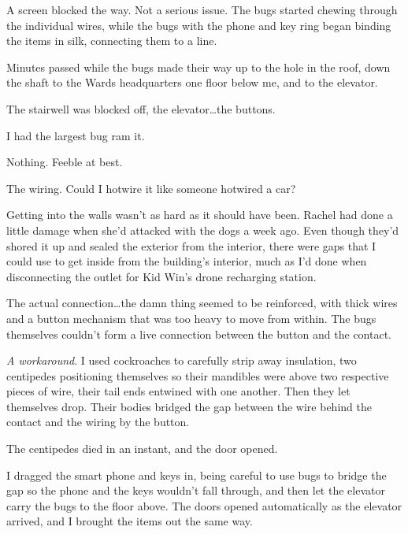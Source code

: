 A screen blocked the way.  Not a serious issue.  The bugs started chewing through the individual wires, while the bugs with the phone and key ring began binding the items in silk, connecting them to a line.



Minutes passed while the bugs made their way up to the hole in the roof, down the shaft to the Wards headquarters one floor below me, and to the elevator.



The stairwell was blocked off, the elevator\ldots the buttons.



I had the largest bug ram it.



Nothing.  Feeble at best.



The wiring.  Could I hotwire it like someone hotwired a car?



Getting into the walls wasn't as hard as it should have been.  Rachel had done a little damage when she'd attacked with the dogs a week ago.  Even though they'd shored it up and sealed the exterior from the interior, there were gaps that I could use to get inside from the building's interior, much as I'd done when disconnecting the outlet for Kid Win's drone recharging station.



The actual connection\ldots the damn thing seemed to be reinforced, with thick wires and a button mechanism that was too heavy to move from within.  The bugs themselves couldn't form a live connection between the button and the contact.



\emph{A workaround}.  I used cockroaches to carefully strip away insulation, two centipedes positioning themselves so their mandibles were above two respective pieces of wire, their tail ends entwined with one another.  Then they let themselves drop.  Their bodies bridged the gap between the wire behind the contact and the wiring by the button.



The centipedes died in an instant, and the door opened.



I dragged the smart phone and keys in, being careful to use bugs to bridge the gap so the phone and the keys wouldn't fall through, and then let the elevator carry the bugs to the floor above.  The doors opened automatically as the elevator arrived, and I brought the items out the same way.



